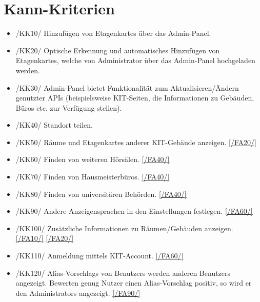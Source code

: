 \section{Kann-Kriterien}

\begin{itemize}

    \item{/KK10/} \label{/KK10/} Hinzufügen von \Glspl{Etagenkarte} über das \Gls{Admin-Panel}.
    \item{/KK20/} \label{/KK20/} Optische Erkennung und automatisches Hinzufügen von \Glspl{Etagenkarte},
          welche von \Gls{Administrator} über das \Gls{Admin-Panel} hochgeladen werden.
          
    \item{/KK30/} \label{/KK30/} \Gls{Admin-Panel} bietet Funktionalität zum Aktualisieren/Ändern genutzter \Gls{API}s (beispielsweise \Gls{KIT}-Seiten, die Informationen zu Gebäuden, Büros etc. zur Verfügung stellen).
    \item{/KK40/} \label{/KK40/} Standort teilen.
    \item{/KK50/} \label{/KK50/} Räume und \Glspl{Etagenkarte} anderer \Gls{KIT}-Gebäude anzeigen. \ref{/FA20/}
    \item{/KK60/} \label{/KK60/} Finden von weiteren Hörsälen. \ref{/FA40/}
    \item{/KK70/} \label{/KK70/} Finden von Hausmeisterbüros. \ref{/FA40/}
    \item{/KK80/} \label{/KK80/} Finden von universitären Behörden. \ref{/FA40/}
    \item{/KK90/} \label{/KK90/} Andere Anzeigensprachen in den Einstellungen festlegen. \ref{/FA60/}
    \item{/KK100/} \label{/KK100/} Zusätzliche Informationen zu Räumen/Gebäuden anzeigen. \ref{/FA10/} \ref{/FA20/}
    \item{/KK110/} \label{/KK110/} Anmeldung mittels \Gls{KIT}-Account. \ref{/FA60/}
    \item{/KK120/} \label{/KK120/} \Glspl{Alias-Vorschlag} von \Glspl{Benutzer} werden anderen \Glspl{Benutzer} angezeigt. Bewerten genug Nutzer einen 
    \Gls{Alias-Vorschlag} positiv, so wird er den \Glspl{Administrator} angezeigt. \ref{/FA90/}
    
        

\end{itemize}
